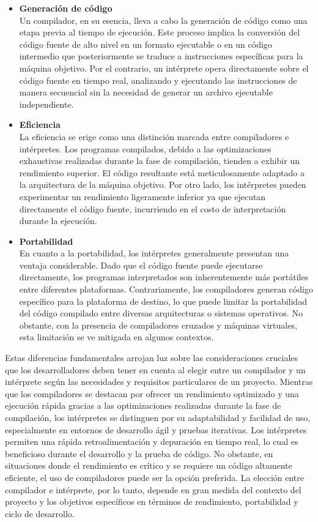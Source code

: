 \begin{itemize}
  \item \textbf{Generación de código} \\
  Un compilador, en su esencia, lleva a cabo la generación de código como una etapa previa al tiempo de ejecución. Este proceso implica la conversión del código fuente de alto nivel en un formato ejecutable o en un código intermedio que posteriormente se traduce a instrucciones específicas para la máquina objetivo. Por el contrario, un intérprete opera directamente sobre el código fuente en tiempo real, analizando y ejecutando las instrucciones de manera secuencial sin la necesidad de generar un archivo ejecutable independiente. \parencite{AlfonsecaMoreno2006}
  \item \textbf{Eficiencia} \\
  La eficiencia se erige como una distinción marcada entre compiladores e intérpretes. Los programas compilados, debido a las optimizaciones exhaustivas realizadas durante la fase de compilación, tienden a exhibir un rendimiento superior. El código resultante está meticulosamente adaptado a la arquitectura de la máquina objetivo. Por otro lado, los intérpretes pueden experimentar un rendimiento ligeramente inferior ya que ejecutan directamente el código fuente, incurriendo en el costo de interpretación durante la ejecución. \parencite{AlfonsecaMoreno2006}
  \item \textbf{Portabilidad} \\
  En cuanto a la portabilidad, los intérpretes generalmente presentan una ventaja considerable. Dado que el código fuente puede ejecutarse directamente, los programas interpretados son inherentemente más portátiles entre diferentes plataformas. Contrariamente, los compiladores generan código específico para la plataforma de destino, lo que puede limitar la portabilidad del código compilado entre diversas arquitecturas o sistemas operativos. No obstante, con la presencia de compiladores cruzados y máquinas virtuales, esta limitación se ve mitigada en algunos contextos. \parencite{AlfonsecaMoreno2006}
\end{itemize}

Estas diferencias fundamentales arrojan luz sobre las consideraciones cruciales que los desarrolladores deben tener en cuenta al elegir entre un compilador y un intérprete según las necesidades y requisitos particulares de un proyecto. Mientras que los compiladores se destacan por ofrecer un rendimiento optimizado y una ejecución rápida gracias a las optimizaciones realizadas durante la fase de compilación, los intérpretes se distinguen por su adaptabilidad y facilidad de uso, especialmente en entornos de desarrollo ágil y pruebas iterativas. Los intérpretes permiten una rápida retroalimentación y depuración en tiempo real, lo cual es beneficioso durante el desarrollo y la prueba de código. No obstante, en situaciones donde el rendimiento es crítico y se requiere un código altamente eficiente, el uso de compiladores puede ser la opción preferida. La elección entre compilador e intérprete, por lo tanto, depende en gran medida del contexto del proyecto y los objetivos específicos en términos de rendimiento, portabilidad y ciclo de desarrollo.

